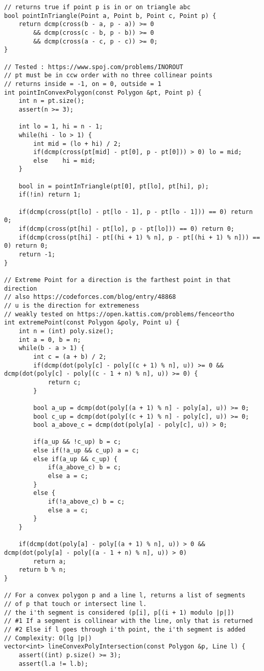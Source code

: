 \documentclass[FSZ,a4paper,onesided]{article}
\begin{document}
\begin{multicols*}{\COLS}
\begin{lstlisting}
// returns true if point p is in or on triangle abc
bool pointInTriangle(Point a, Point b, Point c, Point p) {
    return dcmp(cross(b - a, p - a)) >= 0
        && dcmp(cross(c - b, p - b)) >= 0
        && dcmp(cross(a - c, p - c)) >= 0;
}

// Tested : https://www.spoj.com/problems/INOROUT
// pt must be in ccw order with no three collinear points
// returns inside = -1, on = 0, outside = 1
int pointInConvexPolygon(const Polygon &pt, Point p) {
    int n = pt.size();
    assert(n >= 3);

    int lo = 1, hi = n - 1;
    while(hi - lo > 1) {
        int mid = (lo + hi) / 2;
        if(dcmp(cross(pt[mid] - pt[0], p - pt[0])) > 0) lo = mid;
        else    hi = mid;
    }

    bool in = pointInTriangle(pt[0], pt[lo], pt[hi], p);
    if(!in) return 1;

    if(dcmp(cross(pt[lo] - pt[lo - 1], p - pt[lo - 1])) == 0) return 0;
    if(dcmp(cross(pt[hi] - pt[lo], p - pt[lo])) == 0) return 0;
    if(dcmp(cross(pt[hi] - pt[(hi + 1) % n], p - pt[(hi + 1) % n])) == 0) return 0;
    return -1;
}

// Extreme Point for a direction is the farthest point in that direction
// also https://codeforces.com/blog/entry/48868
// u is the direction for extremeness
// weakly tested on https://open.kattis.com/problems/fenceortho
int extremePoint(const Polygon &poly, Point u) {
    int n = (int) poly.size();
    int a = 0, b = n;
    while(b - a > 1) {
        int c = (a + b) / 2;
        if(dcmp(dot(poly[c] - poly[(c + 1) % n], u)) >= 0 && dcmp(dot(poly[c] - poly[(c - 1 + n) % n], u)) >= 0) {
            return c;
        }

        bool a_up = dcmp(dot(poly[(a + 1) % n] - poly[a], u)) >= 0;
        bool c_up = dcmp(dot(poly[(c + 1) % n] - poly[c], u)) >= 0;
        bool a_above_c = dcmp(dot(poly[a] - poly[c], u)) > 0;

        if(a_up && !c_up) b = c;
        else if(!a_up && c_up) a = c;
        else if(a_up && c_up) {
            if(a_above_c) b = c;
            else a = c;
        }
        else {
            if(!a_above_c) b = c;
            else a = c;
        }
    }

    if(dcmp(dot(poly[a] - poly[(a + 1) % n], u)) > 0 && dcmp(dot(poly[a] - poly[(a - 1 + n) % n], u)) > 0)
        return a;
    return b % n;
}

// For a convex polygon p and a line l, returns a list of segments
// of p that touch or intersect line l.
// the i'th segment is considered (p[i], p[(i + 1) modulo |p|])
// #1 If a segment is collinear with the line, only that is returned
// #2 Else if l goes through i'th point, the i'th segment is added
// Complexity: O(lg |p|)
vector<int> lineConvexPolyIntersection(const Polygon &p, Line l) {
    assert((int) p.size() >= 3);
    assert(l.a != l.b);


\end{lstlisting}
\end{multicols*}
\end{document}
